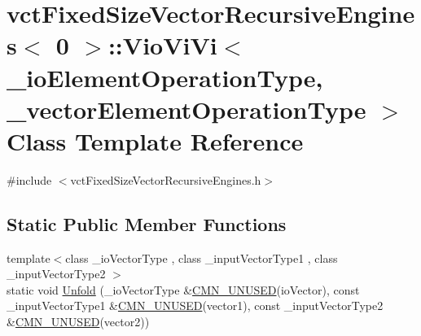 \hypertarget{classvct_fixed_size_vector_recursive_engines_3_010_01_4_1_1_vio_vi_vi}{\section{vct\-Fixed\-Size\-Vector\-Recursive\-Engines$<$ 0 $>$\-:\-:Vio\-Vi\-Vi$<$ \-\_\-io\-Element\-Operation\-Type, \-\_\-vector\-Element\-Operation\-Type $>$ Class Template Reference}
\label{classvct_fixed_size_vector_recursive_engines_3_010_01_4_1_1_vio_vi_vi}
}


{\ttfamily \#include $<$vct\-Fixed\-Size\-Vector\-Recursive\-Engines.\-h$>$}

\subsection*{Static Public Member Functions}
\begin{DoxyCompactItemize}
\item 
{\footnotesize template$<$class \-\_\-io\-Vector\-Type , class \-\_\-input\-Vector\-Type1 , class \-\_\-input\-Vector\-Type2 $>$ }\\static void \hyperlink{classvct_fixed_size_vector_recursive_engines_3_010_01_4_1_1_vio_vi_vi_a3fa8d37bff934b48bf7d5763584a6cb3}{Unfold} (\-\_\-io\-Vector\-Type \&\hyperlink{cmn_portability_8h_a021894e2626935fa2305434b1e893ff6}{C\-M\-N\-\_\-\-U\-N\-U\-S\-E\-D}(io\-Vector), const \-\_\-input\-Vector\-Type1 \&\hyperlink{cmn_portability_8h_a021894e2626935fa2305434b1e893ff6}{C\-M\-N\-\_\-\-U\-N\-U\-S\-E\-D}(vector1), const \-\_\-input\-Vector\-Type2 \&\hyperlink{cmn_portability_8h_a021894e2626935fa2305434b1e893ff6}{C\-M\-N\-\_\-\-U\-N\-U\-S\-E\-D}(vector2))
\end{DoxyCompactItemize}


